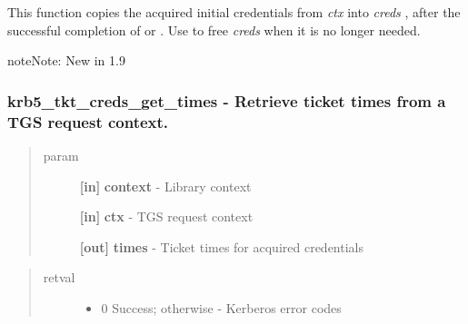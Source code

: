\documentclass[letterpaper,10pt,english]{sphinxmanual}
\begin{document}
This function copies the acquired initial credentials from \emph{ctx} into \emph{creds} , after the successful completion of {\hyperref[appdev/refs/api/krb5_tkt_creds_get:krb5_tkt_creds_get]{}} or {\hyperref[appdev/refs/api/krb5_tkt_creds_step:krb5_tkt_creds_step]{}} . Use {\hyperref[appdev/refs/api/krb5_free_cred_contents:krb5_free_cred_contents]{}} to free \emph{creds} when it is no longer needed.

\begin{notice}{note}{Note:}
New in 1.9
\end{notice}


\subsubsection{krb5\_tkt\_creds\_get\_times -  Retrieve ticket times from a TGS request context.}
\label{appdev/refs/api/krb5_tkt_creds_get_times:krb5-tkt-creds-get-times-retrieve-ticket-times-from-a-tgs-request-context}\label{appdev/refs/api/krb5_tkt_creds_get_times::doc}

\begin{fulllineitems}
\label{appdev/refs/api/krb5_tkt_creds_get_times:krb5_tkt_creds_get_times}
\end{fulllineitems}

\begin{quote}\begin{description}
\item[{param}] \leavevmode
\textbf{{[}in{]}} \textbf{context} - Library context

\textbf{{[}in{]}} \textbf{ctx} - TGS request context

\textbf{{[}out{]}} \textbf{times} - Ticket times for acquired credentials

\end{description}\end{quote}
\begin{quote}\begin{description}
\item[{retval}] \leavevmode\begin{itemize}
\item {} 
0   Success; otherwise - Kerberos error codes

\end{itemize}

\end{description}\end{quote}
\end{document}
